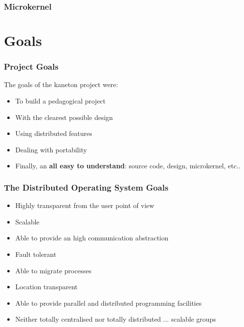 \documentclass[8pt]{beamer}
\begin{document}

\begin{frame}
  \frametitle{Microkernel}

  \begin{center}
  \end{center}
\end{frame}

%
%

\section{Goals}


\begin{frame}
  \frametitle{Project Goals}

  The goals of the kaneton project were:

  \begin{itemize}[<+->]
    \item
      To build a pedagogical project
    \item
      With the clearest possible design
    \item
      Using distributed features
    \item
      Dealing with portability
    \item
      Finally, an \textbf{all easy to understand}:
      source code, design, microkernel, etc..
  \end{itemize}
\end{frame}


\begin{frame}
  \frametitle{The Distributed Operating System Goals}

  \begin{itemize}[<+->]
    \item
      Highly transparent from the user point of view
    \item
      Scalable
    \item
      Able to provide an high communication abstraction
    \item
      Fault tolerant
    \item
      Able to migrate processes
    \item
      Location transparent
    \item
      Able to provide parallel and distributed programming facilities
    \item
      Neither totally centralised nor totally distributed ...
      scalable groups
  \end{itemize}
\end{frame}
\end{document}
